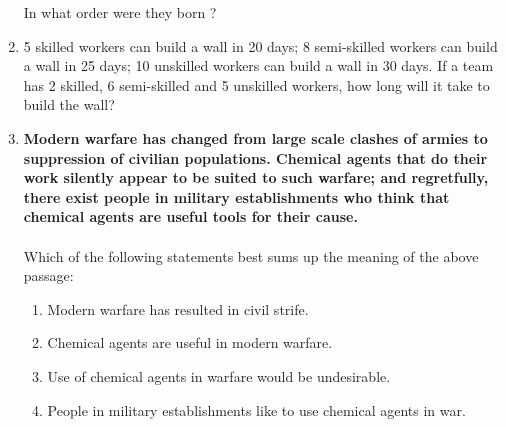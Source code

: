 \documentclass[journal,12pt,onecolumn]{IEEEtran}
\theoremstyle{remark}
\begin{document}
\begin{enumerate}
In what order were they born ?

\hfill{}
\begin{enumerate}
 \end{enumerate}

\item 5 skilled workers can build a wall in 20 days; 8 semi-skilled workers can build a wall in 25 days; 10 unskilled workers can build a wall in 30 days. If a team has 2 skilled, 6 semi-skilled and 5 unskilled workers, how long will it take to build the wall?

\hfill{}\begin{enumerate}  \end{enumerate}



\item \textbf{Modern warfare has changed from large scale clashes of armies to suppression of civilian populations. Chemical agents that do their work silently appear to be suited to such warfare; and regretfully, there exist people in military establishments who think that chemical agents are useful tools for their cause.} \\
\\
Which of the following statements best sums up the meaning of the above passage:

\hfill{}
\begin{enumerate}
    \item Modern warfare has resulted in civil strife.
    \item Chemical agents are useful in modern warfare.
    \item Use of chemical agents in warfare would be undesirable.
    \item People in military establishments like to use chemical agents in war.
\end{enumerate}




\end{enumerate}
\end{document}
